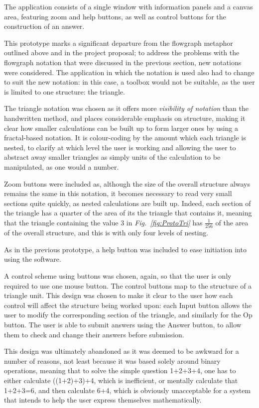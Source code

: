 \documentclass[12pt,twoside,notitlepage,xetex]{report}
\begin{document}
The application consists of a single window with information panels and a canvas area, featuring zoom and help buttons, as well as control buttons for the construction of an answer.

This prototype marks a significant departure from the flowgraph metaphor outlined above and in the project proposal; to address the problems with the flowgraph notation that were discussed in the previous section, new notations were considered.  The application in which the notation is used also had to change to suit the new notation: in this case, a toolbox would not be suitable, as the user is limited to one structure: the triangle.

The triangle notation was chosen as it offers more \emph{visibility of notation} than the handwritten method, and places considerable emphasis on structure, making it clear how smaller calculations can be built up to form larger ones by using a fractal-based notation.  It is colour-coding by the amount which each triangle is nested, to clarify at which level the user is working and allowing the user to abstract away smaller triangles as simply units of the calculation to be manipulated, as one would a number.

Zoom buttons were included as, although the size of the overall structure always remains the same in this notation, it becomes necessary to read very small sections quite quickly, as nested calculations are built up.  Indeed, each section of the triangle has a quarter of the area of its the triangle that contains it, meaning that the triangle containing the value 3 in \emph{Fig.~\ref{fig:ProtoTri}} has $ \frac{1}{256} $ of the area of the overall structure, and this is with only four levels of nesting.

As in the previous prototype, a help button was included to ease initiation into using the software.

A control scheme using buttons was chosen, again, so that the user is only required to use one mouse button.  The control buttons map to the structure of a triangle unit.  This design was chosen to make it clear to the user how each control will affect the structure being worked upon: each {\sfapp Input} button allows the user to modify the corresponding section of the triangle, and similarly for the {\sfapp Op} button.  The user is able to submit answers using the {\sfapp Answer} button, to allow them to check and change their answers before submission.

This design was ultimately abandoned as it was deemed to be awkward for a number of reasons, not least because it was based solely around binary operations, meaning that to solve the simple question 1+2+3+4, one has to either calculate ((1+2)+3)+4, which is inefficient, or mentally calculate that 1+2+3=6, and then calculate 6+4, which is obviously unacceptable for a system that intends to help the user express themselves mathematically.
\end{document}
